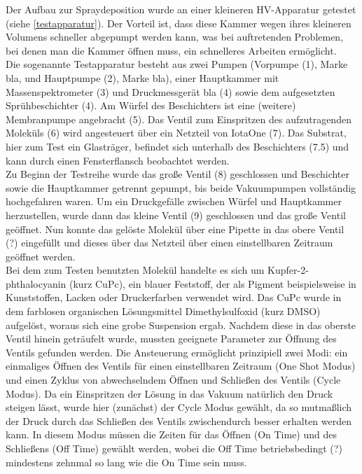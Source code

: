 Der Aufbau zur Spraydeposition wurde an einer kleineren HV-Apparatur getestet (siehe \ref{testapparatur}). Der
Vorteil ist, dass diese Kammer wegen ihres kleineren Volumens schneller abgepumpt werden kann, was bei
auftretenden Problemen, bei denen man die Kammer öffnen muss, ein schnelleres Arbeiten ermöglicht.\\
Die sogenannte Testapparatur besteht aus zwei Pumpen (Vorpumpe (1), Marke bla, und Hauptpumpe (2), Marke bla),
einer Hauptkammer mit Massenspektrometer (3) und Druckmessgerät bla (4) sowie dem aufgesetzten
Sprühbeschichter (4). Am Würfel des Beschichters ist eine (weitere) Membranpumpe angebracht (5). Das Ventil
zum Einspritzen des aufzutragenden Moleküls (6) wird angesteuert über ein Netzteil von IotaOne (7). Das
Substrat, hier zum Test ein Glasträger, befindet sich unterhalb des Beschichters (7.5) und kann durch einen
Fensterflansch beobachtet werden.\\
 Zu Beginn der Testreihe wurde das große Ventil (8) geschlossen und Beschichter sowie die Hauptkammer getrennt
 gepumpt, bis beide Vakuumpumpen vollständig hochgefahren waren. Um ein Druckgefälle zwischen Würfel und
 Hauptkammer herzustellen, wurde dann das kleine Ventil (9) geschlossen und das große Ventil geöffnet. Nun
 konnte das gelöste Molekül über eine Pipette in das obere Ventil (?) eingefüllt und dieses über das Netzteil
 über einen einstellbaren Zeitraum geöffnet werden.\\
Bei dem zum Testen benutzten Molekül handelte es sich um Kupfer-2-phthalocyanin (kurz CuPc), ein blauer
Feststoff, der als Pigment beispielsweise in Kunststoffen, Lacken oder Druckerfarben verwendet wird. Das CuPc
wurde in dem farblosen organischen Lösungsmittel Dimethylsulfoxid (kurz DMSO) aufgelöst, woraus sich eine
grobe Suspension ergab. Nachdem diese in das oberste Ventil hinein geträufelt wurde, mussten geeignete
Parameter zur Öffnung des Ventils gefunden werden. Die Ansteuerung ermöglicht prinzipiell zwei Modi: ein
einmaliges Öffnen des Ventils für einen einstellbaren Zeitraum (One Shot Modus) und einen Zyklus von
abwechselndem Öffnen und Schließen des Ventils (Cycle Modus). Da ein Einspritzen der Lösung in das Vakuum
natürlich den Druck steigen lässt, wurde hier (zunächst) der Cycle Modus gewählt, da so mutmaßlich der Druck
durch das Schließen des Ventils zwischendurch besser erhalten werden kann. In diesem Modus müssen die Zeiten
für das Öffnen (On Time) und des Schließens (Off Time) gewählt werden, wobei die Off Time
betriebsbedingt (?) mindestens zehnmal so lang wie die On Time sein muss. \\
